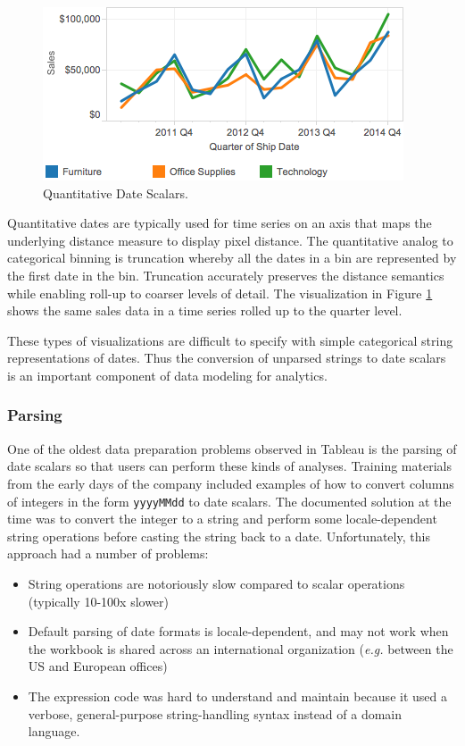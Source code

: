 \begin{figure}[ht]
\centering
\includegraphics[width=\columnwidth]{figures/FigureI2}
\caption{Quantitative Date Scalars.}
\label{fig:I2}
\end{figure}



Quantitative dates are typically used for time series on an axis that maps the underlying distance measure to display pixel distance. The quantitative analog to categorical binning is truncation whereby all the dates in a bin are represented by the first date in the bin. Truncation accurately preserves the distance semantics while enabling roll-up to coarser levels of detail. The visualization in Figure \ref{fig:I2} shows the same sales data in a time series rolled up to the quarter level.

These types of visualizations are difficult to specify with simple categorical string representations of dates. Thus the conversion of unparsed strings to date scalars is an important component of data modeling for analytics.


\subsubsection{Parsing}
One of the oldest data preparation problems observed in Tableau is the parsing of date scalars so that users can perform these kinds of analyses. Training materials from the early days of the company included examples of how to convert columns of integers in the form \texttt{yyyyMMdd} to date scalars. The documented solution at the time was to convert the integer to a string and perform some locale-dependent string operations before casting the string back to a date. Unfortunately, this approach had a number of problems:
\begin{itemize}
\item String operations are notoriously slow compared to scalar operations (typically 10-100x slower)
\item Default parsing of date formats is locale-dependent, and may not work when the workbook is shared across an international organization (\textit{e.g.} between the US and European offices)
\item The expression code was hard to understand and maintain because it used a verbose, general-purpose string-handling syntax instead of a domain language.
\end{itemize}

